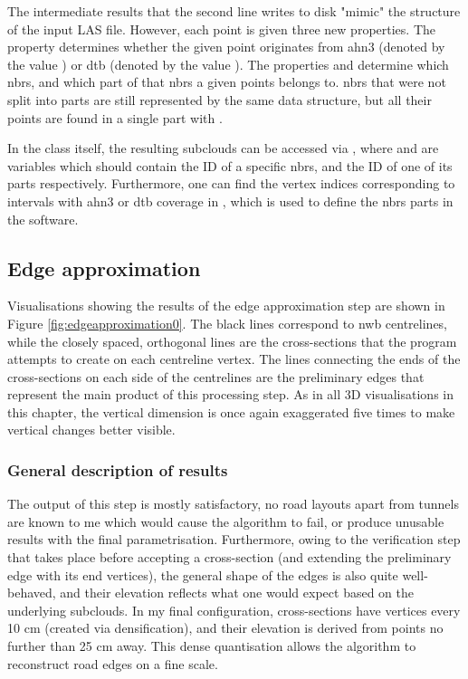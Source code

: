The intermediate results that the second line writes to disk "mimic" the structure of the input LAS file. However, each point is given three new properties. The property  determines whether the given point originates from \ac{ahn3} (denoted by the value ) or \ac{dtb} (denoted by the value ). The properties  and  determine which \ac{nbrs}, and which part of that \ac{nbrs} a given points belongs to. \ac{nbrs} that were not split into parts are still represented by the same data structure, but all their points are found in a single part with .

In the class itself, the resulting subclouds can be accessed via , where  and  are variables which should contain the ID of a specific \ac{nbrs}, and the ID of one of its parts respectively. Furthermore, one can find the vertex indices corresponding to intervals with \ac{ahn3} or \ac{dtb} coverage in , which is used to define the \ac{nbrs} parts in the software.

\subsection{Edge approximation}
\label{sub:r_edgeapproximation}

Visualisations showing the results of the edge approximation step are shown in Figure \ref{fig:edgeapproximation0}. The black lines correspond to \ac{nwb} centrelines, while the closely spaced, orthogonal lines are the cross-sections that the program attempts to create on each centreline vertex. The lines connecting the ends of the cross-sections on each side of the centrelines are the preliminary edges that represent the main product of this processing step. As in all 3D visualisations in this chapter, the vertical dimension is once again exaggerated five times to make vertical changes better visible.

\subsubsection{General description of results}

The output of this step is mostly satisfactory, no road layouts apart from tunnels are known to me which would cause the algorithm to fail, or produce unusable results with the final parametrisation. Furthermore, owing to the verification step that takes place before accepting a cross-section (and extending the preliminary edge with its end vertices), the general shape of the edges is also quite well-behaved, and their elevation reflects what one would expect based on the underlying subclouds. In my final configuration, cross-sections have vertices every 10 cm (created via densification), and their elevation is derived from points no further than 25 cm away. This dense quantisation allows the algorithm to reconstruct road edges on a fine scale.

